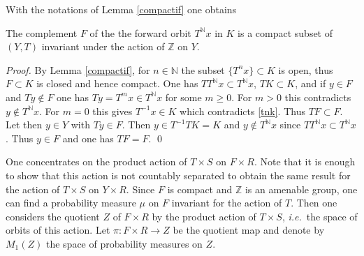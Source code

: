 \documentclass[graybox, envcountsect%
]{svmult}
\def\N{{\mathbb N}}
\def\Z{{\mathbb Z}}
\newcommand{\ie}{{\it i.e.\/}\ }
\begin{document}
 With the notations of Lemma \ref{compactif} one obtains
  
\begin{lemma}\label{compactinv}
	The complement $F$ of the the forward orbit $T^\N x$ in $K$ is a compact  subset of $(Y,T)$ invariant under the action of $\Z$ on $Y$.
\end{lemma}
\begin{proof}  By Lemma \ref{compactif}, for $n\in\N$ the subset $\{T^n x\}\subset  K$ is open, thus $F\subset K$ is closed and hence compact. One has $TT^\N x\subset T^\N x$, $TK\subset K$, and if $y\in F$ and $Ty\notin F$ one has $Ty=T^mx  \in T^\N x$ for some $m\geq 0$. For $m>0$ this contradicts $y\notin T^\N x$. For $m=0$ this gives $T^{-1}x\in K$ which  contradicts \eqref{tnk}. Thus $TF\subset F$. Let then $y\in Y$ with $Ty\in F$. Then $y\in T^{-1}TK=K$ and $y\notin T^\N x$ since $TT^\N x\subset T^\N x$. Thus $y\in F$ and one has $TF=F$.	
\qed\end{proof}

One concentrates on the product action of $T\times S$ on $F\times R$. Note that it is enough to show that this action is not countably separated to obtain the same result for the action of $T\times S$ on $Y\times R$. Since $F$ is compact and $\Z$ is an amenable group, one can find a probability measure $\mu$ on $F$ invariant for the action of $T$. Then one considers the quotient $Z$ of $F\times R$ by the product action of $T\times S$, \ie the space of orbits of this action. Let $\pi:F\times R\to Z$ be the quotient map and denote by $M_1(Z)$ the space of probability measures on $Z$.
\end{document}
